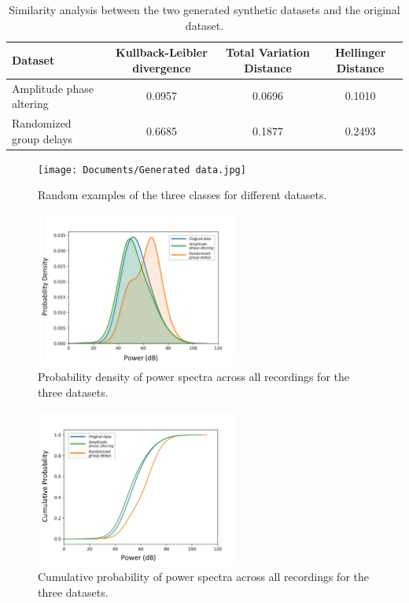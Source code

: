 \documentclass{article}
\begin{document}
\begin{table}
\centering
\caption{Similarity analysis between the two generated synthetic datasets and the original dataset.}
\begin{tabular}{|l|c|c|c|}
\hline
Dataset                  & Kullback-Leibler divergence                & Total Variation Distance & Hellinger Distance \\ \hline
Amplitude phase altering & 0.0957                                     & 0.0696                   & 0.1010             \\ \hline
Randomized group delays   & 0.6685  & 0.1877                   & 0.2493  \\ \hline           
\end{tabular}
\end{table}

\begin{figure}
\centering
    \texttt{[image: Documents/Generated data.jpg]}
    \caption{Random examples of the three classes for different datasets.}
    \label{fig:GD}

\end{figure}


\begin{figure}
\centering
    \includegraphics[width=0.6\textwidth]{Documents/pd.jpg}
    \caption{Probability density of power spectra across all recordings for the three datasets.}
    \label{fig:PD}

\end{figure}


\begin{figure}
\centering
    \includegraphics[width=0.6\textwidth]{Documents/cp.jpg}
    \caption{Cumulative probability of power spectra across all recordings for the three datasets.}
    \label{fig:CP}

\end{figure}
\end{document}
